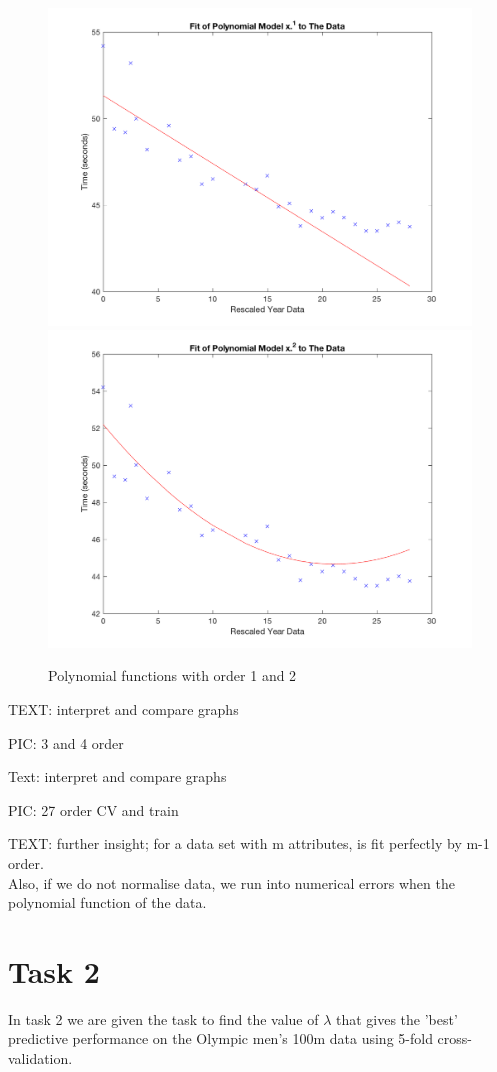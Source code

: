 \begin{figure}[h]
	\centering
	\includegraphics[width=0.7\linewidth]{images/model1}
	\includegraphics[width=0.7\linewidth]{images/model2}
	\caption{Polynomial functions with order 1 and 2}
	\label{fig:model1}
\end{figure}


TEXT: interpret and compare graphs

PIC: 3 and 4 order

Text: interpret and compare graphs

PIC: 27 order CV and train

TEXT: further insight; for a data set with m attributes, is fit perfectly by m-1 order. \\
Also, if we do not normalise data, we run into numerical errors when the polynomial function of the data.
\section{Task 2}
In task 2 we are given the task to find the value of $\lambda$ that gives the 'best' predictive performance on the Olympic men's 100m data using 5-fold cross-validation.
